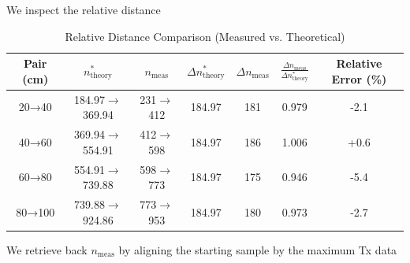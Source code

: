 \documentclass[10pt]{article}
\begin{document}
We inspect the relative distance
\begin{table}[h!]
\centering
\caption{Relative Distance Comparison (Measured vs. Theoretical)}
\begin{tabular}{|c|c|c|c|c|c|c|}
\hline
Pair (cm) & $n^*_{\mathrm{theory}}$ & $n_{\mathrm{meas}}$ & 
$\Delta n^*_{\mathrm{theory}}$ & $\Delta n_{\mathrm{meas}}$ &
$\frac{\Delta n_{\mathrm{meas}}}{\Delta n^*_{\mathrm{theory}}}$ & 
Relative Error (\%) \\
\hline
20→40 & 184.97$\rightarrow$369.94 & 231$\rightarrow$412 & 184.97 & 181 & 0.979 & -2.1 \\
40→60 & 369.94$\rightarrow$554.91 & 412$\rightarrow$598 & 184.97 & 186 & 1.006 & +0.6 \\
60→80 & 554.91$\rightarrow$739.88 & 598$\rightarrow$773 & 184.97 & 175 & 0.946 & -5.4 \\
80→100 & 739.88$\rightarrow$924.86 & 773$\rightarrow$953 & 184.97 & 180 & 0.973 & -2.7 \\
\hline
\end{tabular}
\end{table}
We retrieve back $n_\mathrm{meas}$ by aligning the starting sample by the maximum Tx data 






\end{document}

